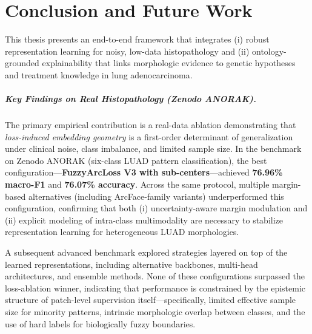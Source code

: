 \chapter{Conclusion and Future Work}

This thesis presents an end-to-end framework that integrates (i) robust representation learning for noisy, low-data histopathology and (ii) ontology-grounded explainability that links morphologic evidence to genetic hypotheses and treatment knowledge in lung adenocarcinoma.

\paragraph{Key Findings on Real Histopathology (Zenodo ANORAK).}
The primary empirical contribution is a real-data ablation demonstrating that \emph{loss-induced embedding geometry} is a first-order determinant of generalization under clinical noise, class imbalance, and limited sample size. In the benchmark on Zenodo ANORAK (six-class LUAD pattern classification), the best configuration---\textbf{FuzzyArcLoss V3 with sub-centers}---achieved \textbf{76.96\% macro-F1} and \textbf{76.07\% accuracy}. Across the same protocol, multiple margin-based alternatives (including ArcFace-family variants) underperformed this configuration, confirming that both (i) uncertainty-aware margin modulation and (ii) explicit modeling of intra-class multimodality are necessary to stabilize representation learning for heterogeneous LUAD morphologies.

A subsequent advanced benchmark explored strategies layered on top of the learned representations, including alternative backbones, multi-head architectures, and ensemble methods. None of these configurations surpassed the loss-ablation winner, indicating that performance is constrained by the epistemic structure of patch-level supervision itself---specifically, limited effective sample size for minority patterns, intrinsic morphologic overlap between classes, and the use of hard labels for biologically fuzzy boundaries.

